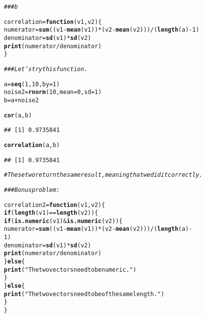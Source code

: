 \documentclass[12pt,letter]{article}\usepackage[]{graphicx}\usepackage[]{color}
\makeatletter
\newcommand{\hlnum}[1]{\textcolor[rgb]{0.686,0.059,0.569}{#1}}%
\newcommand{\hlstr}[1]{\textcolor[rgb]{0.192,0.494,0.8}{#1}}%
\newcommand{\hlcom}[1]{\textcolor[rgb]{0.678,0.584,0.686}{\textit{#1}}}%
\newcommand{\hlopt}[1]{\textcolor[rgb]{0,0,0}{#1}}%
\newcommand{\hlstd}[1]{\textcolor[rgb]{0.345,0.345,0.345}{#1}}%
\newcommand{\hlkwa}[1]{\textcolor[rgb]{0.161,0.373,0.58}{\textbf{#1}}}%
\newcommand{\hlkwb}[1]{\textcolor[rgb]{0.69,0.353,0.396}{#1}}%
\newcommand{\hlkwc}[1]{\textcolor[rgb]{0.333,0.667,0.333}{#1}}%
\newcommand{\hlkwd}[1]{\textcolor[rgb]{0.737,0.353,0.396}{\textbf{#1}}}%
\newenvironment{kframe}{%
 \def\at@end@of@kframe{}%
 \ifinner\ifhmode%
  \def\at@end@of@kframe{\end{minipage}}%
  \begin{minipage}{\columnwidth}%
 \fi\fi%
 \def\FrameCommand##1{\hskip\@totalleftmargin \hskip-\fboxsep
 \colorbox{shadecolor}{##1}\hskip-\fboxsep
     \hskip-\linewidth \hskip-\@totalleftmargin \hskip\columnwidth}%
 \MakeFramed {\advance\hsize-\width
   \@totalleftmargin\z@ \linewidth\hsize
   \@setminipage}}%
 {\par\unskip\endMakeFramed%
 \at@end@of@kframe}
\newenvironment{knitrout}{}{} %
\makeatother
\begin{document}
\begin{knitrout}
\color{fgcolor}\begin{kframe}
\begin{alltt}
\hlcom{### b}

\hlstd{correlation} \hlkwb{=} \hlkwa{function}\hlstd{(}\hlkwc{v1}\hlstd{,} \hlkwc{v2}\hlstd{) \{}
    \hlstd{numerator} \hlkwb{=} \hlkwd{sum}\hlstd{((v1} \hlopt{-} \hlkwd{mean}\hlstd{(v1))} \hlopt{*} \hlstd{(v2} \hlopt{-} \hlkwd{mean}\hlstd{(v2)))}\hlopt{/}\hlstd{(}\hlkwd{length}\hlstd{(a)} \hlopt{-} \hlnum{1}\hlstd{)}
    \hlstd{denominator} \hlkwb{=} \hlkwd{sd}\hlstd{(v1)} \hlopt{*} \hlkwd{sd}\hlstd{(v2)}
    \hlkwd{print}\hlstd{(numerator}\hlopt{/}\hlstd{denominator)}
\hlstd{\}}

\hlcom{### Let's try this function.}

\hlstd{a} \hlkwb{=} \hlkwd{seq}\hlstd{(}\hlnum{1}\hlstd{,} \hlnum{10}\hlstd{,} \hlkwc{by} \hlstd{=} \hlnum{1}\hlstd{)}
\hlstd{noise2} \hlkwb{=} \hlkwd{rnorm}\hlstd{(}\hlnum{10}\hlstd{,} \hlkwc{mean} \hlstd{=} \hlnum{0}\hlstd{,} \hlkwc{sd} \hlstd{=} \hlnum{1}\hlstd{)}
\hlstd{b} \hlkwb{=} \hlstd{a} \hlopt{+} \hlstd{noise2}

\hlkwd{cor}\hlstd{(a, b)}
\end{alltt}
\begin{verbatim}
## [1] 0.9735841
\end{verbatim}
\begin{alltt}
\hlkwd{correlation}\hlstd{(a, b)}
\end{alltt}
\begin{verbatim}
## [1] 0.9735841
\end{verbatim}
\begin{alltt}
\hlcom{# These two return the same result, meaning that we did it correctly.}

\hlcom{### Bonus problem:}

\hlstd{correlation2} \hlkwb{=} \hlkwa{function}\hlstd{(}\hlkwc{v1}\hlstd{,} \hlkwc{v2}\hlstd{) \{}
    \hlkwa{if} \hlstd{(}\hlkwd{length}\hlstd{(v1)} \hlopt{==} \hlkwd{length}\hlstd{(v2)) \{}
        \hlkwa{if} \hlstd{(}\hlkwd{is.numeric}\hlstd{(v1)} \hlopt{&} \hlkwd{is.numeric}\hlstd{(v2)) \{}
            \hlstd{numerator} \hlkwb{=} \hlkwd{sum}\hlstd{((v1} \hlopt{-} \hlkwd{mean}\hlstd{(v1))} \hlopt{*} \hlstd{(v2} \hlopt{-} \hlkwd{mean}\hlstd{(v2)))}\hlopt{/}\hlstd{(}\hlkwd{length}\hlstd{(a)} \hlopt{-}
                \hlnum{1}\hlstd{)}
            \hlstd{denominator} \hlkwb{=} \hlkwd{sd}\hlstd{(v1)} \hlopt{*} \hlkwd{sd}\hlstd{(v2)}
            \hlkwd{print}\hlstd{(numerator}\hlopt{/}\hlstd{denominator)}
        \hlstd{\}} \hlkwa{else} \hlstd{\{}
            \hlkwd{print}\hlstd{(}\hlstr{"The two vectors need to be numeric."}\hlstd{)}
        \hlstd{\}}
    \hlstd{\}} \hlkwa{else} \hlstd{\{}
        \hlkwd{print}\hlstd{(}\hlstr{"The two vectors need to be of the same length."}\hlstd{)}
    \hlstd{\}}
\hlstd{\}}


\end{alltt}
\end{kframe}
\end{knitrout}
\end{document}
